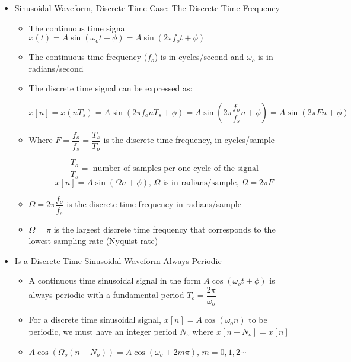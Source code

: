 \begin{itemize}
\begin{itemize}
    \end{itemize}

  \item Sinusoidal Waveform, Discrete Time Case: The Discrete Time Frequency

    \begin{itemize}

      \item The continuous time signal $x(t)=A\sin(\omega_ot+\phi)=A\sin(2\pi f_ot+\phi)$

      \item The continuous time frequency ($f_o$) is in cycles/second and $\omega_o$ is in radians/second

      \item The discrete time signal can be expressed as:

        $$x[n]=x(nT_s)=A\sin(2\pi f_o nT_s+\phi)=A\sin(2\pi\frac{f_o}{f_s}n+\phi)=A\sin(2\pi Fn+\phi)$$

      \item Where $F=\dfrac{f_o}{f_s}=\dfrac{T_s}{T_o}$ is the discrete time frequency, in cycles/sample

        $$\frac{T_o}{T_s}=\text{ number of samples per one cycle of the signal}$$
        $$x[n]=A\sin(\Omega n+\phi),\,\Omega\text{ is in radians/sample, }\Omega=2\pi F$$

      \item $\Omega=2\pi\dfrac{f_o}{f_s}$ is the discrete time frequency in radians/sample

      \item $\Omega=\pi$ is the largest discrete time frequency that corresponds to the lowest sampling rate (Nyquist rate)

    \end{itemize}

  \item Is a Discrete Time Sinusoidal Waveform Always Periodic

    \begin{itemize}

      \item A continuous time sinusoidal signal in the form $A\cos(\omega_o t+\phi)$ is always periodic with a fundamental period $T_o=\dfrac{2\pi}{\omega_o}$

      \item For a discrete time sinusoidal signal, $x[n]=A\cos(\omega_on)$ to be periodic, we must have an integer period $N_o$ where $x[n+N_o]=x[n]$

      \item $A\cos(\Omega_o(n+N_o))=A\cos(\omega_o+2m\pi),\,m=0,1,2\cdots$


\end{itemize}
\end{itemize}
